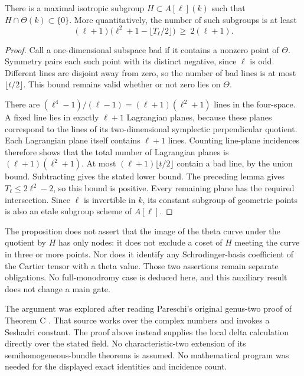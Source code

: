 \begin{proposition}
\label{prop:root-theta-avoiding-Lagrangian}
There is a maximal isotropic subgroup
\(H\subset A[\ell](k)\) such that
\(H\cap\Theta(k)\subset\{0\}\). More quantitatively,
the number of such subgroups is at least
\[
(\ell+1)\bigl(\ell^2+1-\lfloor T_\ell/2\rfloor\bigr)
 \ \ge\ 2(\ell+1).
\]
\end{proposition}
\begin{proof}
Call a one-dimensional subspace bad if it contains a
nonzero point of \(\Theta\). Symmetry pairs each such
point with its distinct negative, since \(\ell\) is odd.
Different lines are disjoint away from zero, so the
number of bad lines is at most \(\lfloor t/2\rfloor\).
This bound remains valid whether or not zero lies on
\(\Theta\).

There are \((\ell^4-1)/(\ell-1)=(\ell+1)(\ell^2+1)\)
lines in the four-space. A fixed line lies in exactly
\(\ell+1\) Lagrangian planes, because these planes
correspond to the lines of its two-dimensional
symplectic perpendicular quotient. Each Lagrangian
plane itself contains \(\ell+1\) lines. Counting
line-plane incidences therefore shows that the total
number of Lagrangian planes is
\((\ell+1)(\ell^2+1)\). At most
\((\ell+1)\lfloor t/2\rfloor\) contain a bad line,
by the union bound. Subtracting gives the stated
lower bound. The preceding lemma gives
\(T_\ell\le2\ell^2-2\), so this bound is positive.
Every remaining plane has the required intersection.
Since \(\ell\) is invertible in \(k\), its constant
subgroup of geometric points is also an etale subgroup
scheme of \(A[\ell]\).
\end{proof}

\begin{remark}
\label{rem:root-theta-avoidance-scope}
The proposition does not assert that the image of the
theta curve under the quotient by \(H\) has only nodes:
it does not exclude a coset of \(H\) meeting the curve
in three or more points. Nor does it identify any
Schrodinger-basis coefficient of the Cartier tensor
with a theta value. Those two assertions remain
separate obligations. No full-monodromy case is
deduced here, and this auxiliary result does not
change a main gate.

The argument was explored after reading Pareschi's
original genus-two proof of Theorem C
\cite[Theorem C, printed pp.~9--10]{Pareschi2021ThetaTorsion}. That source works over the complex
numbers and invokes a Seshadri constant. The proof
above instead supplies the local delta calculation
directly over the stated field. No characteristic-two
extension of its semihomogeneous-bundle theorems is
assumed. No mathematical program was needed for the
displayed exact identities and incidence count.
\end{remark}

